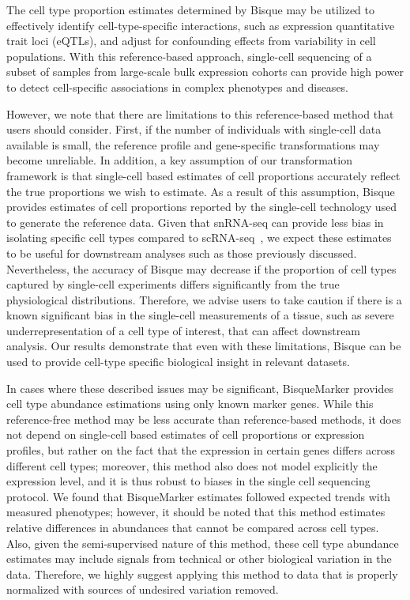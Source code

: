 The cell type proportion estimates determined by Bisque may be utilized to effectively identify cell-type-specific interactions, such as expression quantitative trait loci (eQTLs), and adjust for confounding effects from variability in cell populations. With this reference-based approach, single-cell sequencing of a subset of samples from large-scale bulk expression cohorts can provide high power to detect cell-specific associations in complex phenotypes and diseases. 

However, we note that there are limitations to this reference-based method that users should consider. First, if the number of individuals with single-cell data available is small, the reference profile and gene-specific transformations may become unreliable. In addition, a key assumption of our transformation framework is that single-cell based estimates of cell proportions accurately reflect the true proportions we wish to estimate. As a result of this assumption, Bisque provides estimates of cell proportions reported by the single-cell technology used to generate the reference data. Given that snRNA-seq can provide less bias in isolating specific cell types compared to scRNA-seq~\cite{Wu2019-pq,Bakken2018-nt}, we expect these estimates to be useful for downstream analyses such as those previously discussed. Nevertheless, the accuracy of Bisque may decrease if the proportion of cell types captured by single-cell experiments differs significantly from the true physiological distributions. Therefore, we advise users to take caution if there is a known significant bias in the single-cell measurements of a tissue, such as severe underrepresentation of a cell type of interest, that can affect downstream analysis. Our results demonstrate that even with these limitations, Bisque can be used to provide cell-type specific biological insight in relevant datasets.

In cases where these described issues may be significant, BisqueMarker provides cell type abundance estimations using only known marker genes. While this reference-free method may be less accurate than reference-based methods, it does not depend on single-cell based estimates of cell proportions or expression profiles, but rather on the fact that the expression in certain genes differs across different cell types; moreover, this method also does not model explicitly the expression level, and it is thus robust to biases in the single cell sequencing protocol. We found that BisqueMarker estimates followed expected trends with measured phenotypes; however, it should be noted that this method estimates relative differences in abundances that cannot be compared across cell types. Also, given the semi-supervised nature of this method, these cell type abundance estimates may include signals from technical or other biological variation in the data. Therefore, we highly suggest applying this method to data that is properly normalized with sources of undesired variation removed. 
